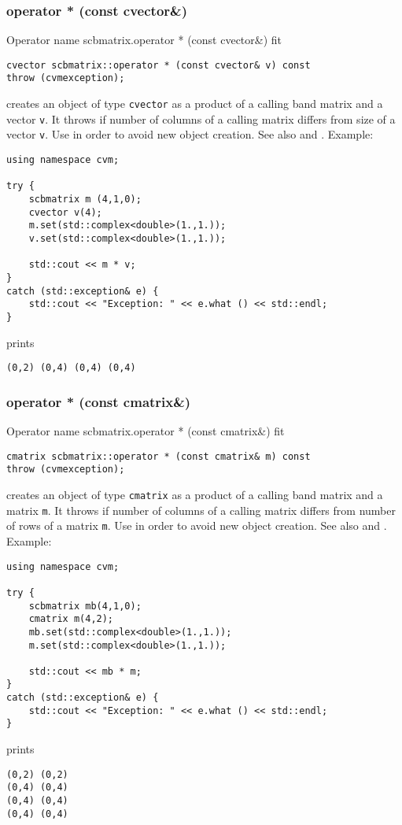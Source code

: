 \subsubsection{operator * (const cvector\&)}
Operator%
\pdfdest name {scbmatrix.operator * (const cvector&)} fit
\begin{verbatim}
cvector scbmatrix::operator * (const cvector& v) const
throw (cvmexception);
\end{verbatim}
creates an object of type \verb"cvector"
as a product of a calling band matrix and a vector \verb"v".
It throws  
if  number of columns of a calling matrix
differs from  size of a vector \verb"v".
Use 
in order to avoid new object creation.
See also
 and .
Example:
\begin{Verbatim}
using namespace cvm;

try {
    scbmatrix m (4,1,0);
    cvector v(4);
    m.set(std::complex<double>(1.,1.));
    v.set(std::complex<double>(1.,1.));

    std::cout << m * v;
}
catch (std::exception& e) {
    std::cout << "Exception: " << e.what () << std::endl;
}
\end{Verbatim}
prints
\begin{Verbatim}
(0,2) (0,4) (0,4) (0,4)
\end{Verbatim}
\newpage



\subsubsection{operator * (const cmatrix\&)}
Operator%
\pdfdest name {scbmatrix.operator * (const cmatrix&)} fit
\begin{verbatim}
cmatrix scbmatrix::operator * (const cmatrix& m) const
throw (cvmexception);
\end{verbatim}
creates an object of type \verb"cmatrix"
as a product of a calling band matrix and a matrix \verb"m".
It throws  
if  number of columns of a calling matrix
differs from  number of rows of a matrix \verb"m".
Use  in order to avoid
 new object creation.
See also
 and .
Example:
\begin{Verbatim}
using namespace cvm;

try {
    scbmatrix mb(4,1,0);
    cmatrix m(4,2);
    mb.set(std::complex<double>(1.,1.));
    m.set(std::complex<double>(1.,1.));

    std::cout << mb * m;
}
catch (std::exception& e) {
    std::cout << "Exception: " << e.what () << std::endl;
}
\end{Verbatim}
prints
\begin{Verbatim}
(0,2) (0,2)
(0,4) (0,4)
(0,4) (0,4)
(0,4) (0,4)
\end{Verbatim}
\newpage




